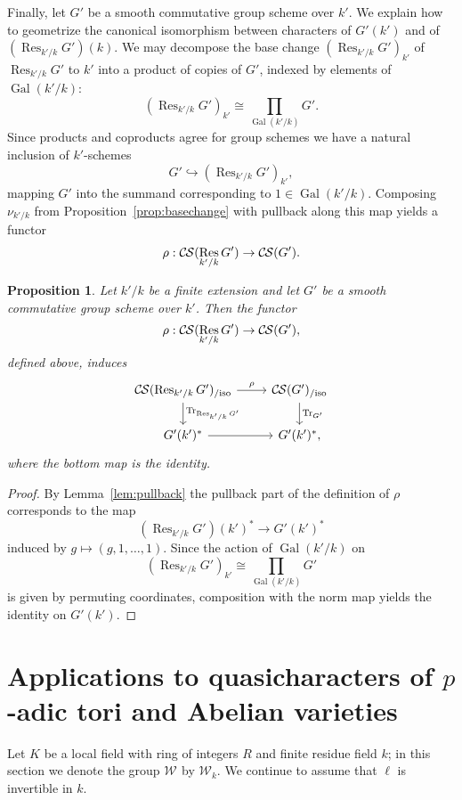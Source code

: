 \documentclass[10pt]{amsart}
\theoremstyle{plain}
\newtheorem{proposition}[theorem]{Proposition}
\theoremstyle{definition}
\newcommand{\Fq}{k}
\newcommand{\Weil}[1]{\mathcal{W}_{#1}}
\DeclareMathOperator{\Gal}{Gal}
\DeclareMathOperator{\Res}{Res}
\newcommand{\TrFrob}[1]{\operatorname{Tr}_{#1}}
\newcommand{\CS}{{\mathcal{C\hskip-0.8pt S}}}
\newcommand{\CSiso}[1]{\CS(#1)_{/\text{iso}}}
\begin{document}
Finally, let $G'$ be a smooth commutative group scheme over $k'$.
We explain how to geometrize the canonical isomorphism between characters of $G'(k')$ and of $(\Res_{k'/k}G')(k)$.
We may decompose the base change $(\Res_{k'/k}G')_{k'}$ of $\Res_{k'/k}G'$ to $k'$
into a product of copies of $G'$, indexed by elements of $\Gal(k'/k)$:
\[
(\Res_{k'/k}G')_{k'} \cong \prod_{\Gal(k'/k)} G'.
\]
Since products and coproducts agree for group schemes we have a natural inclusion of $k'$-schemes
\[
G' \hookrightarrow (\Res_{k'/k}G')_{k'},
\]
mapping $G'$ into the summand corresponding to $1 \in \Gal(k'/k)$.  Composing $\nu_{k'/k}$
from Proposition~\ref{prop:basechange} with pullback along this map yields a functor
\[
\rho : \CS(\Res_{k'/k}G') \to \CS(G').
\]

\begin{proposition}
Let $k'/k$ be a finite extension and let $G'$ be a smooth commutative group scheme over $k'$.
Then the functor 
\[
\rho : \CS(\Res_{k'/k}G') \to \CS(G'),
\]
defined above, induces
\[
\begin{tikzcd}
\CSiso{\Res_{k'/k} G'} \dar{\TrFrob{\Res_{k'/k} G'}} \rar{\rho} & \CSiso{G'} \dar{\TrFrob{G'}}\\
G'(k')^* \rar & G'(k')^*,
\end{tikzcd}
\]
where the bottom map is the identity.
\end{proposition}
\begin{proof}
By Lemma~\ref{lem:pullback} the pullback part of the definition of $\rho$ corresponds to the map
\[
(\Res_{k'/k}G')(k')^* \to G'(k')^*
\]
induced by $g \mapsto (g, 1, \ldots, 1)$.  Since the action of $\Gal(k'/k)$ on
\[
(\Res_{k'/k}G')_{k'} \cong \prod_{\Gal(k'/k)} G'
\]
is given by permuting coordinates, composition with the norm map yields the identity on $G'(k')$.
\end{proof}


\section{Applications to quasicharacters of $p$-adic tori and Abelian varieties}\label{sec:applications}

Let $K$ be a local field with ring of integers $R$ and finite residue field $\Fq$; in this section we denote the group $\Weil{}$ by $\Weil{\Fq}$.
We continue to assume that $\ell$ is invertible in $\Fq$.
\end{document}

